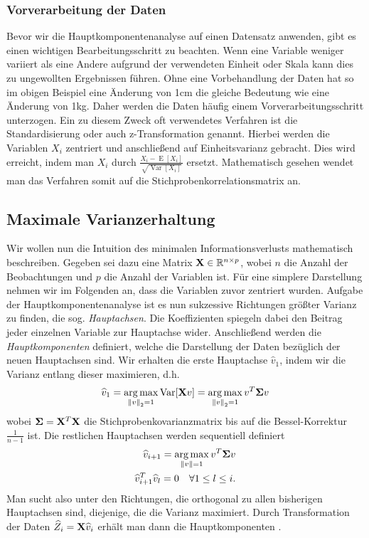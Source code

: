 \subsubsection{Vorverarbeitung der Daten}

Bevor wir die Hauptkomponentenanalyse auf einen Datensatz anwenden, gibt es einen wichtigen Bearbeitungsschritt zu beachten. Wenn eine Variable weniger variiert als eine Andere aufgrund der verwendeten Einheit oder Skala kann dies zu ungewollten Ergebnissen führen. Ohne eine Vorbehandlung der Daten hat so im obigen Beispiel eine Änderung von 1cm die gleiche Bedeutung wie eine Änderung von 1kg.  Daher werden die Daten häufig einem Vorverarbeitungsschritt unterzogen. Ein zu diesem Zweck oft verwendetes Verfahren ist die Standardisierung oder auch z-Transformation genannt. Hierbei werden die Variablen $X_i$ zentriert und anschließend auf Einheitsvarianz gebracht. Dies wird erreicht, indem man $X_i$ durch $\frac{X_i - \operatorname{E}[X_i]}{\sqrt{\operatorname{Var}[X_i]}}$ ersetzt. Mathematisch gesehen wendet man das Verfahren somit auf die Stichprobenkorrelationsmatrix an.

\subsection{Maximale Varianzerhaltung}

Wir wollen nun die Intuition des minimalen Informationsverlusts mathematisch beschreiben. Gegeben sei dazu eine Matrix $\mathbf{X} \in \mathbb{R}^{n\times p}$, wobei $n$ die Anzahl der Beobachtungen und $p$ die Anzahl der Variablen ist. Für eine simplere Darstellung nehmen wir im Folgenden an, dass die Variablen zuvor zentriert wurden. Aufgabe der Hauptkomponentenanalyse ist es nun sukzessive Richtungen größter Varianz zu finden, die sog. \textit{Hauptachsen}. Die Koeffizienten spiegeln dabei den Beitrag jeder einzelnen Variable zur Hauptachse wider. Anschließend werden die \textit{Hauptkomponenten} definiert, welche die Darstellung der Daten bezüglich der neuen Hauptachsen sind. Wir erhalten die erste Hauptachse $\widehat{v}_1$, indem wir die Varianz entlang dieser maximieren, d.h.
\begin{align}
\label{pca_variance_maximization_first}
\widehat{v}_1 = \operatorname*{arg\,max}_{\left\lVert v \right\rVert_2 = 1} \operatorname{Var}[\mathbf{X}v] = \operatorname*{arg\,max}_{\left\lVert v \right\rVert_2 = 1} v^T \mathbf{\Sigma} v
\end{align}
wobei $\mathbf{\Sigma} = \mathbf{X}^T\mathbf{X}$ die Stichprobenkovarianzmatrix bis auf die Bessel-Korrektur $\frac{1}{n-1}$ ist. Die restlichen Hauptachsen werden sequentiell definiert
\begin{align}
\label{pca_variance_maximization_rest}
\begin{split}
\widehat{v}_{i+1} = \operatorname*{arg\,max}_{\left\lVert v \right\rVert = 1} v^T \mathbf{\Sigma} v\\
\widehat{v}_{i+1}^T\widehat{v}_l = 0 \quad \forall 1 \leq l \leq i.
\end{split}
\end{align}
Man sucht also unter den Richtungen, die orthogonal zu allen bisherigen Hauptachsen sind, diejenige, die die Varianz maximiert. Durch Transformation der Daten $\widehat{Z}_i = \mathbf{X}\widehat{v}_i$ erhält man dann die Hauptkomponenten \cite{vidal}.

